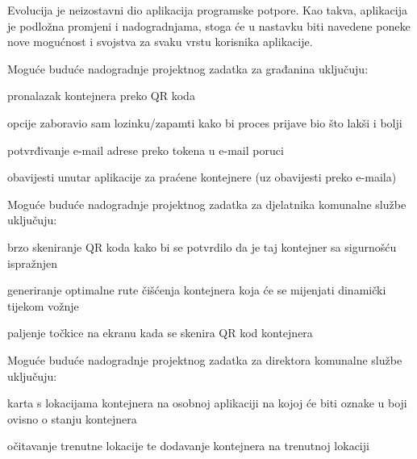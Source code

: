 		Evolucija je neizostavni dio aplikacija programske potpore. Kao takva, aplikacija je podložna promjeni i nadogradnjama, stoga će u nastavku biti navedene poneke nove mogućnost i svojstva za svaku vrstu korisnika aplikacije.
		
		Moguće buduće nadogradnje projektnog zadatka za građanina uključuju:
		\begin{packed_item}
			
			\item pronalazak kontejnera preko QR koda
			\item opcije zaboravio sam lozinku/zapamti kako bi proces prijave bio što lakši i bolji
			\item potvrđivanje e-mail adrese preko tokena u e-mail poruci
			\item obavijesti unutar aplikacije za praćene kontejnere (uz obavijesti preko e-maila)
			
		\end{packed_item}
		
		Moguće buduće nadogradnje projektnog zadatka za djelatnika komunalne službe uključuju:
		\begin{packed_item}
			
			\item brzo skeniranje QR koda kako bi se potvrdilo da je taj kontejner sa sigurnošću ispražnjen
			\item generiranje optimalne rute čišćenja kontejnera koja će se mijenjati dinamički tijekom vožnje
			\item paljenje točkice na ekranu kada se skenira QR kod kontejnera
			
		\end{packed_item}
	
		Moguće buduće nadogradnje projektnog zadatka za direktora komunalne službe uključuju:
		\begin{packed_item}
			
			\item karta s lokacijama kontejnera na osobnoj aplikaciji na kojoj će biti oznake u boji ovisno o stanju kontejnera
			\item očitavanje trenutne lokacije te dodavanje kontejnera na trenutnoj lokaciji
			
		\end{packed_item}
		\eject
